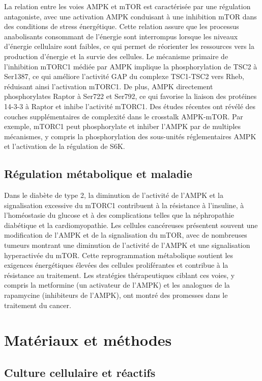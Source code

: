 \documentclass[11pt,a4paper]{article}
\begin{document}
La relation entre les voies AMPK et mTOR est caractérisée par une régulation antagoniste, avec une activation AMPK conduisant à une inhibition mTOR dans des conditions de stress énergétique. Cette relation assure que les processus anabolisants consommant de l'énergie sont interrompus lorsque les niveaux d'énergie cellulaire sont faibles, ce qui permet de réorienter les ressources vers la production d'énergie et la survie des cellules. Le mécanisme primaire de l'inhibition mTORC1 médiée par AMPK implique la phosphorylation de TSC2 à Ser1387, ce qui améliore l'activité GAP du complexe TSC1-TSC2 vers Rheb, réduisant ainsi l'activation mTORC1. De plus, AMPK directement phosphorylates Raptor à Ser722 et Ser792, ce qui favorise la liaison des protéines 14-3-3 à Raptor et inhibe l'activité mTORC1. Des études récentes ont révélé des couches supplémentaires de complexité dans le crosstalk AMPK-mTOR. Par exemple, mTORC1 peut phosphorylate et inhiber l'AMPK par de multiples mécanismes, y compris la phosphorylation des sous-unités réglementaires AMPK et l'activation de la régulation de S6K.

\subsection{Régulation métabolique et maladie}

Dans le diabète de type 2, la diminution de l'activité de l'AMPK et la signalisation excessive du mTORC1 contribuent à la résistance à l'insuline, à l'homéostasie du glucose et à des complications telles que la néphropathie diabétique et la cardiomyopathie. Les cellules cancéreuses présentent souvent une modification de l'AMPK et de la signalisation du mTOR, avec de nombreuses tumeurs montrant une diminution de l'activité de l'AMPK et une signalisation hyperactivée du mTOR. Cette reprogrammation métabolique soutient les exigences énergétiques élevées des cellules proliférantes et contribue à la résistance au traitement. Les stratégies thérapeutiques ciblant ces voies, y compris la metformine (un activateur de l'AMPK) et les analogues de la rapamycine (inhibiteurs de l'AMPK), ont montré des promesses dans le traitement du cancer.

\section{Matériaux et méthodes}

\subsection{Culture cellulaire et réactifs}
\end{document}
